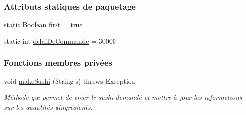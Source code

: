 \subsubsection*{Attributs statiques de paquetage}
\begin{DoxyCompactItemize}
\item 
static Boolean \hyperlink{classSuchi_1_1Client_a49b4963073d8a2e5f27a4e28ef6a34b4}{first} = true
\item 
static int \hyperlink{classSuchi_1_1Client_a3c43b94040bc2b1368f63270b8dbeeaf}{delai\+De\+Commande} = 30000
\end{DoxyCompactItemize}
\subsubsection*{Fonctions membres privées}
\begin{DoxyCompactItemize}
\item 
void \hyperlink{classSuchi_1_1Client_aa9dfeaacdef8b8b3815e544e6b7217f8}{make\+Sushi} (String s)  throws Exception
\begin{DoxyCompactList}\small\item\em Méthode qui permet de créer le sushi demandé et mettre à jour les informations sur les quantités d\textquotesingle{}ingrédients. \end{DoxyCompactList}\end{DoxyCompactItemize}

